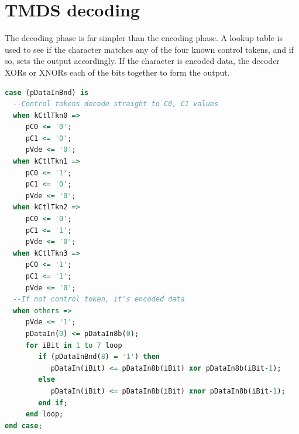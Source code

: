 \section{TMDS decoding}

The decoding phase is far simpler than the encoding phase. A lookup table is used to see if the character matches any of the four known control tokens, and if so, sets the output accordingly. If the character is encoded data, the decoder XORs or XNORs each of the bits together to form the output.

\begin{lstlisting}[caption={TMDS decoding logic.}, label={lst:tmds_decode}, language=VHDL]
case (pDataInBnd) is
  --Control tokens decode straight to C0, C1 values
  when kCtlTkn0 =>
     pC0 <= '0';
     pC1 <= '0';
     pVde <= '0';
  when kCtlTkn1 =>
     pC0 <= '1';
     pC1 <= '0';
     pVde <= '0';               
  when kCtlTkn2 =>
     pC0 <= '0';
     pC1 <= '1';
     pVde <= '0';
  when kCtlTkn3 =>
     pC0 <= '1';
     pC1 <= '1';
     pVde <= '0';
  --If not control token, it's encoded data
  when others =>
     pVde <= '1'; 
     pDataIn(0) <= pDataIn8b(0);
     for iBit in 1 to 7 loop
        if (pDataInBnd(8) = '1') then
           pDataIn(iBit) <= pDataIn8b(iBit) xor pDataIn8b(iBit-1);
        else
           pDataIn(iBit) <= pDataIn8b(iBit) xnor pDataIn8b(iBit-1);
        end if;
     end loop;                           
end case;
\end{lstlisting}
